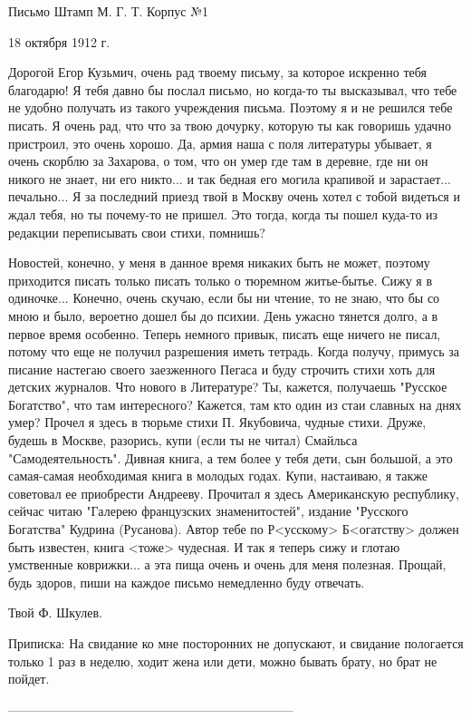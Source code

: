 Письмо
Штамп М. Г. Т. Корпус №1

18 октября 1912 г.

Дорогой Егор Кузьмич, очень рад твоему письму, за которое искренно тебя благодарю!
Я тебя давно бы послал письмо, но когда-то ты высказывал, что тебе не удобно получать из такого учреждения письма. Поэтому я и не решился тебе писать. Я очень рад, что что за твою дочурку, которую ты как говоришь удачно пристроил, это очень хорошо. Да, армия наша с поля литературы убывает, я очень скорблю за Захарова, о том, что он умер где там в деревне, где ни он никого не знает, ни его никто... и так бедная его могила крапивой и зарастает... печально...
Я за последний приезд твой в Москву очень хотел с тобой видеться и ждал тебя, но ты почему-то не пришел. Это тогда, когда ты пошел куда-то из редакции переписывать свои стихи, помнишь?

Новостей, конечно, у меня в данное время никаких быть не может, поэтому приходится писать только писать только о тюремном житье-бытье. Сижу я в одиночке... Конечно, очень скучаю, если бы ни чтение, то не знаю, что бы со мною и было,  вероетно дошел бы до психии. День ужасно тянется долго, а в первое время особенно.
Теперь немного привык, писать еще ничего не писал, потому что еще не получил разрешения иметь тетрадь.
Когда получу, примусь за писание настегаю своего заезженного Пегаса и буду строчить стихи хоть для детских журналов. Что нового в Литературе? Ты, кажется, получаешь "Русское Богатство", что там интересного? Кажется, там кто один из стаи славных на днях умер? Прочел я здесь в тюрьме стихи П. Якубовича, чудные стихи. Друже, будешь в Москве, разорись, купи (если ты не читал) Смайльса "Самодеятельность". Дивная книга, а тем более у тебя дети, сын большой, а это самая-самая необходимая книга в молодых годах. Купи, настаиваю, я также советовал ее приобрести Андрееву. Прочитал я здесь Американскую республику, сейчас читаю "Галерею французских знаменитостей", издание "Русского Богатства" Кудрина (Русанова). Автор тебе по Р<усскому> Б<огатству> должен быть известен, книга <тоже> чудесная. И так я теперь сижу и глотаю умственные коврижки... а эта пища очень и очень для меня полезная.
Прощай, будь здоров, пиши на каждое письмо немедленно буду отвечать.

Твой Ф. Шкулев.

Приписка: 
На свидание ко мне посторонних не допускают, и свидание пологается только 1 раз в неделю, ходит жена или дети, можно бывать брату, но брат не пойдет.

--------------------------------------------------------------------

